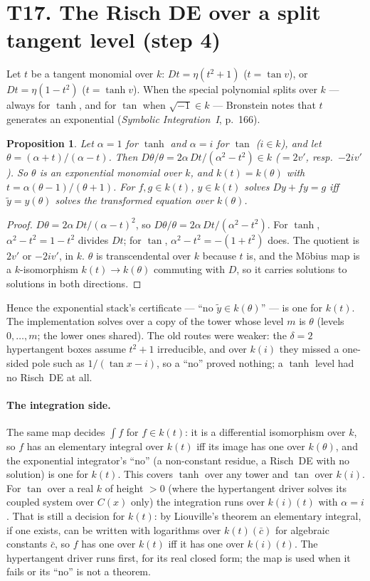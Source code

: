 \documentclass[11pt]{article}
\newtheorem{proposition}[theorem]{Proposition}
\theoremstyle{definition}
\theoremstyle{remark}
\begin{document}
\section*{T17. The Risch DE over a split tangent level (step 4)}
\label{sec:T17}

Let $t$ be a tangent monomial over $k$: $Dt=\eta(t^2+1)$ ($t=\tan v$), or
$Dt=\eta(1-t^2)$ ($t=\tanh v$). When the special polynomial splits over $k$ --- always for
$\tanh$, and for $\tan$ when $\sqrt{-1}\in k$ --- Bronstein notes that $t$ generates
an exponential (\emph{Symbolic Integration~I}, p.~166).

\begin{proposition}\label{prop:T17}
Let $\alpha=1$ for $\tanh$ and $\alpha=i$ for $\tan$ ($i\in k$), and let
$\theta=(\alpha+t)/(\alpha-t)$. Then $D\theta/\theta=2\alpha\,Dt/(\alpha^2-t^2)\in k$
($=2v'$, resp.\ $-2iv'$). So $\theta$ is an exponential monomial over $k$, and
$k(t)=k(\theta)$ with $t=\alpha(\theta-1)/(\theta+1)$. For $f,g\in k(t)$, $y\in k(t)$ solves
$Dy+fy=g$ iff $\tilde y=y(\theta)$ solves the transformed equation over $k(\theta)$.
\end{proposition}
\begin{proof}
$D\theta=2\alpha\,Dt/(\alpha-t)^2$, so $D\theta/\theta=2\alpha\,Dt/(\alpha^2-t^2)$. For
$\tanh$, $\alpha^2-t^2=1-t^2$ divides $Dt$; for $\tan$, $\alpha^2-t^2=-(1+t^2)$ does. The
quotient is $2v'$ or $-2iv'$, in $k$. $\theta$ is transcendental over $k$ because $t$ is,
and the M\"obius map is a $k$-isomorphism $k(t)\to k(\theta)$ commuting with $D$,
so it carries solutions to solutions in both directions.
\end{proof}
\noindent Hence the exponential stack's certificate --- ``no $\tilde y\in k(\theta)$'' ---
is one for $k(t)$. The implementation solves over a copy of the tower whose level $m$ is
$\theta$ (levels $0,\dots,m$; the lower ones shared). The old routes were weaker: the
$\delta=2$ hypertangent boxes assume $t^2+1$ irreducible, and over $k(i)$ they missed a
one-sided pole such as $1/(\tan x-i)$, so a ``no'' proved nothing; a $\tanh$ level had no
Risch~DE at all.

\paragraph{The integration side.} The same map decides $\int f$ for $f\in k(t)$: it is a
differential isomorphism over $k$, so $f$ has an elementary integral over $k(t)$ iff its
image has one over $k(\theta)$, and the exponential integrator's ``no'' (a non-constant
residue, a Risch~DE with no solution) is one for $k(t)$. This covers $\tanh$ over any
tower and $\tan$ over $k(i)$. For $\tan$ over a real $k$ of height $>0$ (where the
hypertangent driver solves its coupled system over $C(x)$ only) the integration runs over
$k(i)(t)$ with $\alpha=i$. That is still a decision for $k(t)$: by Liouville's theorem an
elementary integral, if one exists, can be written with logarithms over $k(t)(\bar c)$
for algebraic constants $\bar c$, so $f$ has one over $k(t)$ iff it has one over
$k(i)(t)$. The hypertangent driver runs first, for its real closed form; the map is used
when it fails or its ``no'' is not a theorem.
\end{document}

